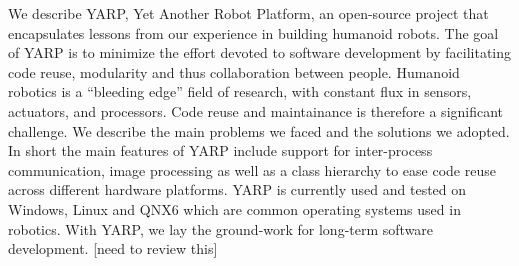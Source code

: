 
We describe YARP, Yet Another Robot Platform, an open-source project
that encapsulates lessons from our experience in building humanoid
robots.  The goal of YARP is to minimize the effort
devoted to software development by facilitating code reuse, 
modularity and thus collaboration between people. Humanoid robotics is a ``bleeding edge'' field of research, with constant flux in sensors, actuators, and 
processors.  Code reuse and maintainance is therefore a significant 
challenge. We describe the main problems we faced and the 
solutions we adopted. 
In short the main features of YARP include support for inter-process
communication, image processing as well as a class hierarchy
to ease code reuse across different hardware platforms. YARP
is currently used and tested on Windows, Linux and QNX6 which are common 
operating systems used in robotics. With YARP, we lay the ground-work for long-term
software development. [need to review this]
